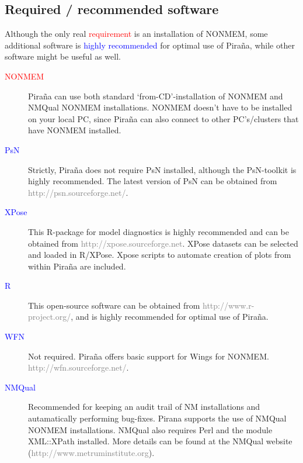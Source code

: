 \documentclass[a4,11pt]{report} \usepackage[pdftex]{graphicx}
\begin{document}
\subsection{Required / recommended software} Although the only real
\textcolor{Red}{requirement} is an installation of NONMEM, some
additional software is \textcolor{Blue}{highly recommended} for
optimal use of Pira\~na, while other software might be useful as well.
\begin{description}
\item[\textcolor{Red}{NONMEM}] Pira\~na can use both standard
  `from-CD'-installation of NONMEM and NMQual NONMEM
  installations. NONMEM doesn't have to be installed on your local PC,
  since Pira\~na can also connect to other PC's/clusters that have
  NONMEM installed.

\item[\textcolor{Blue}{PsN}] Strictly, Pira\~na does not require PsN
  installed, although the PsN-toolkit is highly recommended. The latest
  version of PsN can be obtained from
  \textcolor{Grey}{http://psn.sourceforge.net/}.

\item[\textcolor{Blue}{XPose}] This R-package for model diagnostics is
  highly recommended and can be obtained from
  \textcolor{Grey}{http://xpose.sourceforge.net}. XPose datasets can be selected and loaded in
  R/XPose. Xpose scripts to automate creation of plots from within
  Pira\~na are included.

\item[\textcolor{Blue}{R}] This open-source software can be
obtained from \textcolor{Grey}{http://www.r-project.org/}, and is highly
recommended for optimal use of Pira\~na.

\item[\textcolor{Blue}{WFN}] Not required. Pira\~na offers basic
  support for Wings for NONMEM. \textcolor{Grey}{http://wfn.sourceforge.net/}.

  \item[\textcolor{Blue}{NMQual}] Recommended for keeping an audit
trail of NM installations and autamatically performing
bug-fixes. Pirana supports the use of NMQual NONMEM installations. NMQual
also requires Perl and the module XML::XPath installed. More details
can be found at the NMQual website
(\textcolor{Grey}{http://www.metruminstitute.org}).
\end{description}
\end{document}
